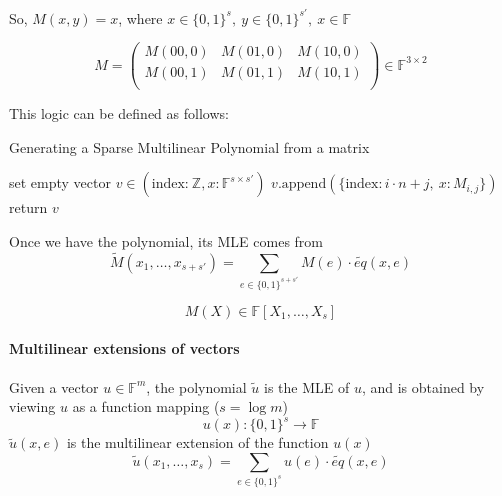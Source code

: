 \documentclass{article}
\theoremstyle{definition}
\begin{document}
So, $M(x, y) = x$, where $x \in \{0,1\}^s,~ y \in \{0,1\}^{s'},~ x \in \mathbb{F}$

$$
M = \begin{pmatrix}
M(00,0) & M(01,0) & M(10,0)\\
M(00,1) & M(01,1) & M(10,1)\\
\end{pmatrix}
\in \mathbb{F}^{3 \times 2}
$$

This logic can be defined as follows:

\begin{algorithm}[H]
\caption{Generating a Sparse Multilinear Polynomial from a matrix}
\begin{algorithmic}
	\State set empty vector $v \in (\text{index:}~ \mathbb{Z}, x: \mathbb{F}^{s \times s'})$
			\State $v.\text{append}( \{ \text{index}: i \cdot n + j,~ x: M_{i,j} \} )$
		\EndIf
	\EndFor
	\EndFor
	\State return $v$    
\end{algorithmic}
\end{algorithm}

Once we have the polynomial, its MLE comes from
$$\widetilde{M}(x_1, \ldots, x_{s+s'}) = \sum_{e \in \{0,1\}^{s+s'}} M(e) \cdot \widetilde{eq}(x, e)$$

$$M(X) \in \mathbb{F}[X_1, \ldots, X_s]$$

\paragraph{Multilinear extensions of vectors}
Given a vector $u \in \mathbb{F}^m$, the polynomial $\widetilde{u}$ is the MLE of $u$, and is obtained by viewing $u$ as a function mapping ($s=\log m$)
$$u(x): \{0,1\}^s \rightarrow \mathbb{F}$$
$\widetilde{u}(x, e)$ is the multilinear extension of the function $u(x)$
$$\widetilde{u}(x_1, \ldots, x_s) = \sum_{e \in \{0,1\}^s} u(e) \cdot \widetilde{eq}(x, e)$$



\end{document}
